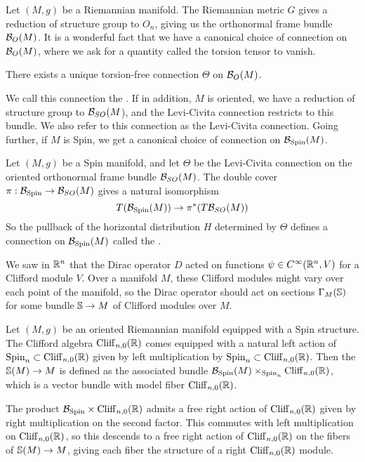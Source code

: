 Let $(M,g)$ be a Riemannian manifold. The Riemannian metric $G$ gives a
reduction of structure group to $O_n$, giving us the orthonormal frame bundle
$\B_O(M)$. It is a wonderful fact that we have a canonical choice of connection
on $\B_O(M)$, where we ask for a quantity called the torsion tensor to vanish.
%
\begin{thm}
There exists a unique torsion-free connection $\Theta$ on $\B_O(M)$.
\end{thm}
We call this connection the . If in addition,
$M$ is oriented, we have a reduction of structure group to $\B_{SO}(M$), and
the Levi-Civita connection restricts to this bundle. We also refer to this
connection as the Levi-Civita connection. Going further, if $M$ is Spin,
we get a canonical choice of connection on $\B_{\Spin}(M)$.
%
\begin{defn}
Let $(M,g)$ be a Spin manifold, and let $\Theta$ be the Levi-Civita connection
on the oriented orthonormal frame bundle $\B_{SO}(M)$. The double cover
$\pi : \B_{\Spin} \to \B_{SO}(M)$ gives a natural isomorphism
\[
T(\B_{\Spin}(M)) \to \pi^*(T\B_{SO}(M))
\]
So the pullback of the horizontal distribution $H$ determined by $\Theta$
defines a connection on $\B_{\Spin}(M)$ called the .
\end{defn}
%
We saw in $\R^n$ that the Dirac operator $D$ acted on functions
$\psi \in C^\infty(\R^n, V)$ for a Clifford module $V$. Over a manifold $M$,
these Clifford modules might vary over each point of the manifold, so the
Dirac operator should act on sections $\Gamma_M(\S)$ for some bundle $\S \to M$
of Clifford modules over $M$.
%
\begin{defn}
Let $(M,g)$ be an oriented Riemannian manifold equipped with a Spin structure.
The Clifford algebra $\Cliff_{n,0}(\R)$ comes equipped with a natural left
action of $\Spin_n \subset \Cliff_{n,0}(\R)$ given by left multiplication by
$\Spin_n \subset \Cliff_{n,0}(\R)$. Then the  $\S(M) \to M$ is
defined as the associated bundle $\B_{\Spin}(M) \times_{\Spin_n} \Cliff_{n,0}(\R)$,
which is a vector bundle with model fiber $\Cliff_{n,0}(\R)$.
\end{defn}
%
The product $\B_{\Spin} \times \Cliff_{n,0}(\R)$ admits a free right action of
$\Cliff_{n,0}(\R)$ given by right multiplication on the second factor. This
commutes with left multiplication on $\Cliff_{n,0}(\R)$, so this descends to a
free right action of $\Cliff_{n,0}(\R)$ on the fibers of $\S(M) \to M$, giving
each fiber the structure of a right $\Cliff_{n,0}(\R)$ module. \\
%

